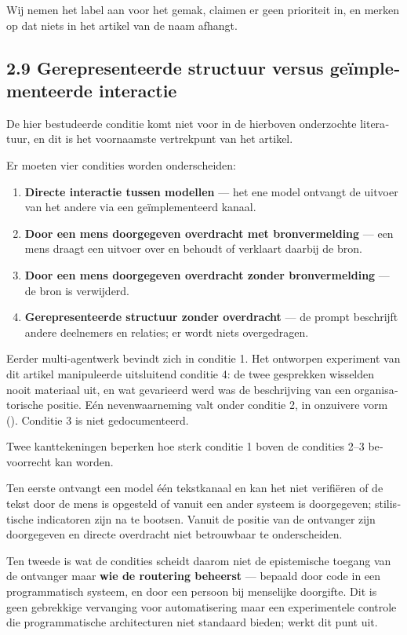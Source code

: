 \begin{dutch}
Wij nemen het label aan voor het gemak, claimen er geen prioriteit in, en merken op dat niets in het artikel van de naam afhangt.


\subsection*{2.9 Gerepresenteerde structuur versus geïmplementeerde interactie}
\label{sec:nl:2.9}

De hier bestudeerde conditie komt niet voor in de hierboven onderzochte literatuur, en dit is het voornaamste vertrekpunt van het artikel.

Er moeten vier condities worden onderscheiden:

\begin{enumerate}
  \item \textbf{Directe interactie tussen modellen} — het ene model ontvangt de uitvoer van het andere via een geïmplementeerd kanaal.
  \item \textbf{Door een mens doorgegeven overdracht met bronvermelding} — een mens draagt een uitvoer over en behoudt of verklaart daarbij de bron.
  \item \textbf{Door een mens doorgegeven overdracht zonder bronvermelding} — de bron is verwijderd.
  \item \textbf{Gerepresenteerde structuur zonder overdracht} — de prompt beschrijft andere deelnemers en relaties; er wordt niets overgedragen.
\end{enumerate}
Eerder multi-agentwerk bevindt zich in conditie 1. Het ontworpen experiment van dit artikel manipuleerde uitsluitend conditie 4: de twee gesprekken wisselden nooit materiaal uit, en wat gevarieerd werd was de beschrijving van een organisatorische positie. Eén nevenwaarneming valt onder conditie 2, in onzuivere vorm (). Conditie 3 is niet gedocumenteerd.

Twee kanttekeningen beperken hoe sterk conditie 1 boven de condities 2–3 bevoorrecht kan worden.

Ten eerste ontvangt een model één tekstkanaal en kan het niet verifiëren of de tekst door de mens is opgesteld of vanuit een ander systeem is doorgegeven; stilistische indicatoren zijn na te bootsen. Vanuit de positie van de ontvanger zijn doorgegeven en directe overdracht niet betrouwbaar te onderscheiden.

Ten tweede is wat de condities scheidt daarom niet de epistemische toegang van de ontvanger maar \textbf{wie de routering beheerst} — bepaald door code in een programmatisch systeem, en door een persoon bij menselijke doorgifte. Dit is geen gebrekkige vervanging voor automatisering maar een experimentele controle die programmatische architecturen niet standaard bieden;  werkt dit punt uit.



\end{dutch}
